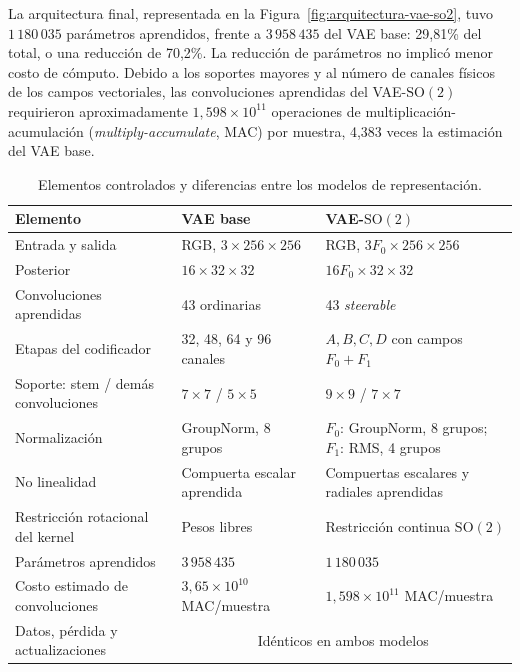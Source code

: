 \enlargethispage{\baselineskip}
La arquitectura final, representada en la
Figura~\ref{fig:arquitectura-vae-so2}, tuvo \(1\,180\,035\) parámetros
aprendidos, frente a \(3\,958\,435\) del VAE base: 29,81\% del total, o una
reducción de 70,2\%. La reducción de parámetros no implicó menor costo de
cómputo. Debido a los soportes mayores y al número de canales físicos de los
campos vectoriales, las convoluciones aprendidas del VAE-\(\mathrm{SO}(2)\)
requirieron aproximadamente \(1,598\times10^{11}\) operaciones de
multiplicación-acumulación (\emph{multiply-accumulate}, MAC) por muestra, 4,383 veces la estimación del VAE base.

\begin{table}[htbp]
    \centering
    \caption{Elementos controlados y diferencias entre los modelos de representación.}
    \label{tab:comparacion-arquitecturas}
    \small
    \begin{tabularx}{\textwidth}{@{}p{}XX@{}}
        \toprule
        Elemento & VAE base & VAE-\(\mathrm{SO}(2)\) \\
        \midrule
        Entrada y salida & RGB, \(3\times256\times256\) & RGB, \(3F_0\times256\times256\) \\
        Posterior & \(16\times32\times32\) & \(16F_0\times32\times32\) \\
        Convoluciones aprendidas & 43 ordinarias & 43 \emph{steerable} \\
        Etapas del codificador & 32, 48, 64 y 96 canales & \(A,B,C,D\) con campos \(F_0+F_1\) \\
        Soporte: stem / demás convoluciones & \(7\times7\) / \(5\times5\) & \(9\times9\) / \(7\times7\) \\
        Normalización & GroupNorm, 8 grupos & \(F_0\): GroupNorm, 8 grupos; \(F_1\): RMS, 4 grupos \\
        No linealidad & Compuerta escalar aprendida & Compuertas escalares y radiales aprendidas \\
        Restricción rotacional del kernel & Pesos libres & Restricción continua \(\mathrm{SO}(2)\) \\
        Parámetros aprendidos & \(3\,958\,435\) & \(1\,180\,035\) \\
        Costo estimado de convoluciones & \(3,65\times10^{10}\) MAC/muestra & \(1,598\times10^{11}\) MAC/muestra \\
        Datos, pérdida y actualizaciones & \multicolumn{2}{c}{Idénticos en ambos modelos} \\
        \bottomrule
    \end{tabularx}
\end{table}

